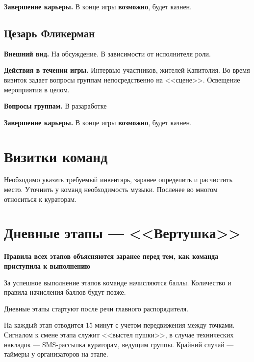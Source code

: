 \documentclass[a4paper, 14pt]{extarticle}
\theoremstyle{definition}
\begin{document}
\par \textbf{Завершение карьеры.} В конце игры \textbf{возможно}, будет казнен.


{}
\subsection*{Цезарь Фликерман}

\par \textbf{Внешний вид.} На обсуждение. В зависимости от исполнителя роли.

\par \textbf{Действия в течении игры.} Интервью участников, жителей Капитолия. Во время визиток задает вопросы группам непосредственно на <<сцене>>. Освещение мероприятия в целом.

\par \textbf{Вопросы группам.} В разаработке

\par \textbf{Завершение карьеры.} В конце игры \textbf{возможно}, будет казнен.



\cleardoublepage
{}
{}
\section*{Визитки команд}

\par Необходимо указать требуемый инвентарь, заранее определить и расчистить место. Уточнить у команд необходимость музыки. Посленее во многом относиться к кураторам.



\cleardoublepage
{}
{}
\section*{Дневные этапы --- <<Вертушка>>}

\par \textbf{Правила всех этапов объясняются заранее перед тем, как команда приступила к выполнению}
\par За успешное выполнение этапов команде начисляются баллы. Количество и правила начисления баллов будут позже.
\par Дневные этапы стартуют после речи главного распорядителя.
\par На каждый этап отводится 15 минут с учетом передвижения между точками. Сигналом к смене этапа служит <<выстел пушки>>, в случае технических накладок --- SMS-рассылка кураторам, ведущим группы. Крайний случай --- таймеры у организаторов на этапе.
\end{document}
